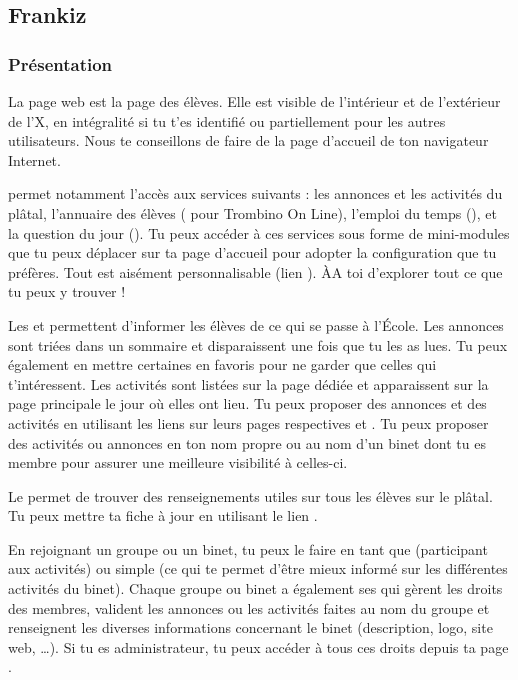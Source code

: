 \subsection{Frankiz}


\subsubsection{Présentation}

\label{frankiz} La page web \fkz est la page des élèves. Elle est visible de l'intérieur et de
l'extérieur de l'X, en intégralité si tu t'es identifié ou partiellement pour les autres
utilisateurs. Nous te conseillons de faire de  la page d'accueil de ton navigateur Internet.

\fkz permet notamment l'accès aux services suivants : les
annonces et les activités du plâtal, l'annuaire des élèves
( pour Trombino On Line), l'emploi du temps (), et la question du jour (). Tu peux accéder à ces services sous forme de mini-modules que tu peux déplacer sur ta page d'accueil pour adopter la configuration que tu préfères.
Tout est aisément personnalisable (lien ). ÀA toi d'explorer tout ce que tu peux y trouver !

Les  et  permettent d'informer les élèves de ce qui se passe à  l'École. Les annonces sont triées dans
un sommaire et disparaissent une fois que tu les as lues. Tu peux également en mettre certaines en favoris pour ne garder que celles qui t'intéressent. Les activités sont listées sur la page dédiée et apparaissent
sur la page principale le jour où elles ont lieu. Tu peux proposer des annonces et des activités en utilisant les liens sur leurs pages respectives  et . Tu peux proposer des activités ou annonces en ton nom propre ou au nom d'un binet dont tu es membre pour assurer une meilleure visibilité à celles-ci.

Le  permet de trouver des renseignements utiles sur
tous les élèves sur le plâtal. Tu peux mettre ta fiche à  jour en
utilisant le lien .

En rejoignant un groupe ou un binet, tu peux le faire en tant que  (participant aux activités) ou simple  (ce qui te permet d'être mieux informé sur les différentes activités du binet). Chaque groupe ou binet a également ses  qui gèrent les droits des membres, valident les annonces ou les activités faites au nom du groupe et renseignent les diverses informations concernant le binet (description, logo, site web, \dots). Si tu es administrateur, tu peux accéder à tous ces droits depuis ta page .

